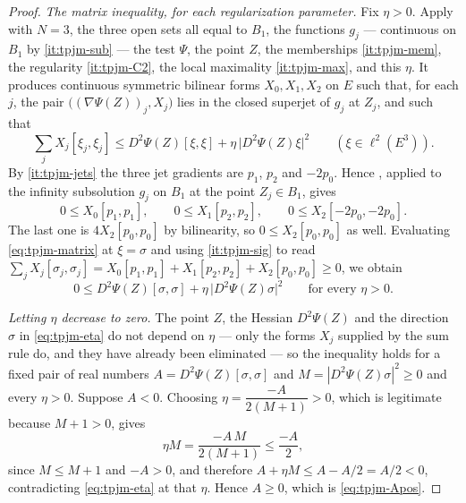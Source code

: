 \begin{proof}
\emph{The matrix inequality, for each regularization parameter.} Fix
$\eta>0$. Apply  with $N=3$, the three open sets all equal
to $B_1$, the functions $g_j$ --- continuous on $B_1$ by \ref{it:tpjm-sub} ---
the test $\Psi$, the point $Z$, the memberships \ref{it:tpjm-mem}, the
regularity \ref{it:tpjm-C2}, the local maximality \ref{it:tpjm-max}, and this
$\eta$. It produces continuous symmetric bilinear forms
$X_0,X_1,X_2$ on $E$ such that, for each $j$, the pair
$\bigl((\nabla\Psi(Z))_j,X_j\bigr)$ lies in the closed superjet of $g_j$ at
$Z_j$, and such that
\begin{equation}\label{eq:tpjm-matrix}
  \sum_jX_j[\xi_j,\xi_j]\le D^2\Psi(Z)[\xi,\xi]
    +\eta\,\bigl|D^2\Psi(Z)\xi\bigr|^2
  \qquad(\xi\in\ell^2(E^3)).
\end{equation}
By \ref{it:tpjm-jets} the three jet gradients are $p_1$, $p_2$ and $-2p_0$.
Hence , applied to the infinity
subsolution $g_j$ on $B_1$ at the point $Z_j\in B_1$, gives
\[
  0\le X_0[p_1,p_1],\qquad 0\le X_1[p_2,p_2],\qquad
  0\le X_2[-2p_0,-2p_0] .
\]
The last one is $4X_2[p_0,p_0]$ by bilinearity, so $0\le X_2[p_0,p_0]$ as well.
Evaluating \eqref{eq:tpjm-matrix} at $\xi=\sigma$ and using \ref{it:tpjm-sig} to
read $\sum_jX_j[\sigma_j,\sigma_j]=X_0[p_1,p_1]+X_1[p_2,p_2]+X_2[p_0,p_0]\ge0$,
we obtain
\begin{equation}\label{eq:tpjm-eta}
  0\le D^2\Psi(Z)[\sigma,\sigma]+\eta\,\bigl|D^2\Psi(Z)\sigma\bigr|^2
  \qquad\text{for every }\eta>0 .
\end{equation}

\emph{Letting $\eta$ decrease to zero.} The point $Z$, the Hessian
$D^2\Psi(Z)$ and the direction $\sigma$ in \eqref{eq:tpjm-eta} do not depend on
$\eta$ --- only the forms $X_j$ supplied by the sum rule do, and they have
already been eliminated --- so the inequality holds for a fixed pair of real
numbers $A=D^2\Psi(Z)[\sigma,\sigma]$ and $M=|D^2\Psi(Z)\sigma|^2\ge0$ and every
$\eta>0$. Suppose $A<0$. Choosing
$\eta=\dfrac{-A}{2(M+1)}>0$, which is legitimate because $M+1>0$, gives
\[
  \eta M=\frac{-A\,M}{2(M+1)}\le\frac{-A}{2},
\]
since $M\le M+1$ and $-A>0$, and therefore $A+\eta M\le A-A/2=A/2<0$,
contradicting \eqref{eq:tpjm-eta} at that $\eta$. Hence $A\ge0$, which is
\eqref{eq:tpjm-Apos}.
\end{proof}
